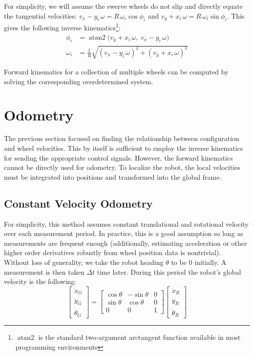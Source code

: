 \documentclass{article}
\begin{document}
For simplicity, we will assume the swerve wheels do not slip and directly equate the tangential velocities: $v_x - y_i \, \omega = R \, \omega_i \operatorname{cos} \phi_i$ and $v_y + x_i \, \omega = R \, \omega_i \operatorname{sin} \phi_i$. This gives the following inverse kinematics\footnote{$\operatorname{atan2}$ is the standard two-argument arctangent function available in most programming environments}:
\begin{align*}
    \phi_i &= \operatorname{atan2} \big( v_y + x_i \, \omega, \; v_x - y_i \, \omega \big)\\
    \omega_i &= \frac{1}{R} \sqrt{(v_x - y_i \, \omega)^2 + (v_y + x_i \, \omega)^2}
\end{align*}

Forward kinematics for a collection of multiple wheels can be computed by solving the corresponding overdetermined system.

\section{Odometry}
The previous section focused on finding the relationship between configuration and wheel velocities. This by itself is sufficient to employ the inverse kinematics for sending the appropriate control signals. However, the forward kinematics cannot be directly used for odometry. To localize the robot, the local velocities must be integrated into positions and transformed into the global frame.

\subsection{Constant Velocity Odometry}
For simplicity, this method assumes constant translational and rotational velocity over each measurement period. In practice, this is a good assumption so long as measurements are frequent enough (additionally, estimating acceleration or other higher order derivatives robustly from wheel position data is nontrivial).\\

Without loss of generality, we take the robot heading $\theta$ to be $0$ initially. A measurement is then taken $\Delta t$ time later. During this period the robot's global velocity is the following:
$$
\begin{bmatrix}
    \dot{x}_G \\
    \dot{y}_G \\
    \dot{\theta}_G
\end{bmatrix}
=
\begin{bmatrix}
    \operatorname{cos} \theta & -\operatorname{sin} \theta & 0 \\
    \operatorname{sin} \theta & \operatorname{cos} \theta & 0 \\
    0 & 0 & 1
\end{bmatrix}
\begin{bmatrix}
    \dot{x}_R \\
    \dot{y}_R \\
    \dot{\theta}_R
\end{bmatrix}
$$
\end{document}
